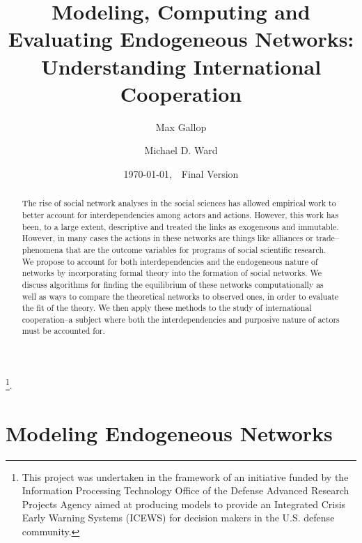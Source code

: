 \documentclass[12pt,onesided,fullpage]{amsart}
\begin{document}
\title[Games on Networks: Thailand]{Modeling, Computing and Evaluating Endogeneous Networks: Understanding International Cooperation}

\author{Max Gallop}
\address{Max Gallop: Department of Political Science}
 
\author{Michael D. Ward}
\address{Michael D. Ward: Department of Political Science}
\thanks{This project was undertaken in the framework of an initiative funded by the Information Processing Technology Office of the Defense Advanced Research Projects Agency aimed at producing models to provide an Integrated Crisis Early Warning Systems (ICEWS) for decision makers in the U.S. defense community. }.
\\


\date{\today,~~Final Version}
\maketitle

\begin{abstract}
The rise of social network analyses in the social sciences has allowed empirical work to better account for interdependencies among actors and actions. However, this work has been, to a large extent, descriptive and treated the links as exogeneous and immutable. However, in many cases the actions in these networks are things like alliances or trade--phenomena that are the outcome variables for programs of social scientific research. We propose to account for both interdependencies and the endogeneous nature of networks by incorporating formal theory into the formation of social networks. We discuss algorithms for finding the equilibrium of these networks computationally as well as ways to compare the theoretical networks to observed ones, in order to evaluate the fit of the theory. We then apply these methods to the study of international cooperation--a subject where both the interdependencies and purposive nature of actors must be accounted for.
\end{abstract}
 

\section{Modeling Endogeneous Networks}
\end{document}
